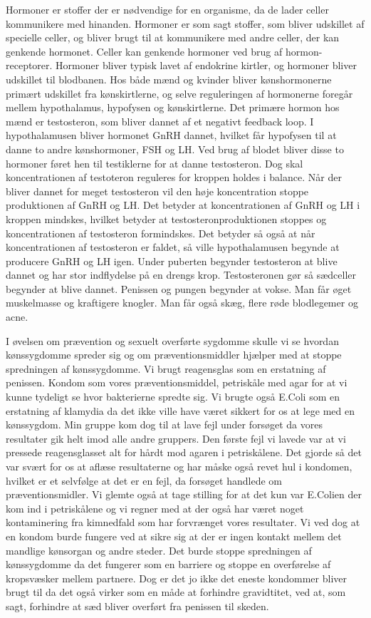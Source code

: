 Hormoner er stoffer der er nødvendige for en organisme, da de lader celler kommunikere med hinanden. Hormoner er som sagt stoffer, som bliver udskillet af specielle celler, og bliver brugt til at kommunikere med andre celler, der kan genkende hormonet. Celler kan genkende hormoner ved brug af hormon-receptorer. Hormoner bliver typisk lavet af endokrine kirtler, og hormoner bliver udskillet til blodbanen. Hos både mænd og kvinder bliver kønshormonerne primært udskillet fra kønskirtlerne, og selve reguleringen af hormonerne foregår mellem hypothalamus, hypofysen og kønskirtlerne. 
Det primære hormon hos mænd er testosteron, som bliver dannet af et negativt feedback loop. I hypothalamusen bliver hormonet GnRH dannet, hvilket får hypofysen til at danne to andre kønshormoner, FSH og LH. Ved brug af blodet bliver disse to hormoner føret hen til testiklerne for at danne testosteron. Dog skal koncentrationen af testoteron reguleres for kroppen holdes i balance. Når der bliver dannet for meget testosteron vil den høje koncentration stoppe produktionen af GnRH og LH. Det betyder at koncentrationen af GnRH og LH i kroppen mindskes, hvilket betyder at testosteronproduktionen stoppes og koncentrationen af testosteron formindskes. Det betyder så også at når koncentrationen af testosteron er faldet, så ville hypothalamusen begynde at producere GnRH og LH igen. 
Under puberten begynder testosteron at blive dannet og har stor indflydelse på en drengs krop. Testosteronen gør så sædceller begynder at blive dannet. Penissen og pungen begynder at vokse. Man får øget muskelmasse og kraftigere knogler. Man får også skæg, flere røde blodlegemer og acne.

I øvelsen om prævention og sexuelt overførte sygdomme skulle vi se hvordan kønssygdomme spreder sig og om præventionsmiddler hjælper med at stoppe spredningen af kønssygdomme. Vi brugt reagensglas som en erstatning af penissen. Kondom som vores præventionsmiddel, petriskåle med agar for at vi kunne tydeligt se hvor bakterierne spredte sig. Vi brugte også E.Coli som en erstatning af klamydia da det ikke ville have været sikkert for os at lege med en kønssygdom. Min gruppe kom dog til at lave fejl under forsøget da vores resultater gik helt imod alle andre gruppers. Den første fejl vi lavede var at vi pressede reagensglasset alt for hårdt mod agaren i petriskålene. Det gjorde så det var svært for os at aflæse resultaterne og har måske også revet hul i kondomen, hvilket er et selvfølge at det er en fejl, da forsøget handlede om præventionsmidler. Vi glemte også at tage stilling for at det kun var E.Colien der kom ind i petriskålene og vi regner med at der også har været noget kontaminering fra kimnedfald som har forvrænget vores resultater. 
Vi ved dog at en kondom burde fungere ved at sikre sig at der er ingen kontakt mellem det mandlige kønsorgan og andre steder. Det burde stoppe spredningen af kønssygdomme da det fungerer som en barriere og stoppe en overførelse af kropsvæsker mellem partnere. Dog er det jo ikke det eneste kondommer bliver brugt til da det også virker som en måde at forhindre gravidtitet, ved at, som sagt, forhindre at sæd bliver overført fra penissen til skeden.
